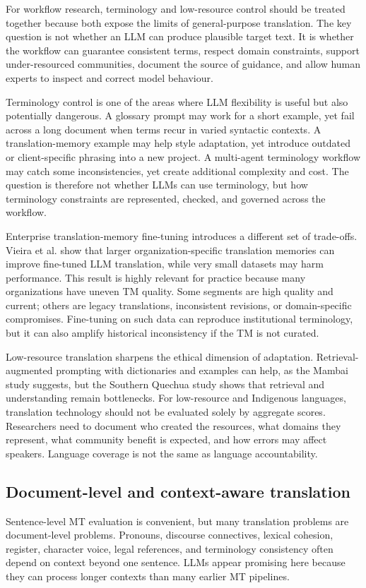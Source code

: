 \documentclass[11pt]{article}
\begin{document}
For workflow research, terminology and low-resource control should be treated together because both expose the limits of general-purpose translation. The key question is not whether an LLM can produce plausible target text. It is whether the workflow can guarantee consistent terms, respect domain constraints, support under-resourced communities, document the source of guidance, and allow human experts to inspect and correct model behaviour.


Terminology control is one of the areas where LLM flexibility is useful but also potentially dangerous. A glossary prompt may work for a short example, yet fail across a long document when terms recur in varied syntactic contexts. A translation-memory example may help style adaptation, yet introduce outdated or client-specific phrasing into a new project. A multi-agent terminology workflow may catch some inconsistencies, yet create additional complexity and cost. The question is therefore not whether LLMs can use terminology, but how terminology constraints are represented, checked, and governed across the workflow.

Enterprise translation-memory fine-tuning introduces a different set of trade-offs. Vieira et al. show that larger organization-specific translation memories can improve fine-tuned LLM translation, while very small datasets may harm performance. This result is highly relevant for practice because many organizations have uneven TM quality. Some segments are high quality and current; others are legacy translations, inconsistent revisions, or domain-specific compromises. Fine-tuning on such data can reproduce institutional terminology, but it can also amplify historical inconsistency if the TM is not curated.

Low-resource translation sharpens the ethical dimension of adaptation. Retrieval-augmented prompting with dictionaries and examples can help, as the Mambai study suggests, but the Southern Quechua study shows that retrieval and understanding remain bottlenecks. For low-resource and Indigenous languages, translation technology should not be evaluated solely by aggregate scores. Researchers need to document who created the resources, what domains they represent, what community benefit is expected, and how errors may affect speakers. Language coverage is not the same as language accountability.


\subsection{Document-level and context-aware translation}
Sentence-level MT evaluation is convenient, but many translation problems are document-level problems. Pronouns, discourse connectives, lexical cohesion, register, character voice, legal references, and terminology consistency often depend on context beyond one sentence. LLMs appear promising here because they can process longer contexts than many earlier MT pipelines.
\end{document}
